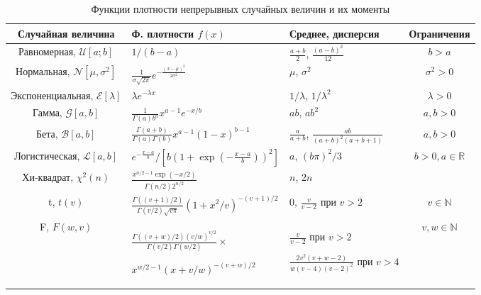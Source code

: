 \begin{table}[h]
\caption{\label{tab:density} Функции плотности непрерывных случайных величин и их моменты}
\begin{tabular}{cp{6cm}p{4cm}c}
\hline 
\hline
Случайная величина & Ф. плотности $f(x)$ & Среднее, дисперсия & Ограничения\\ 
\hline 
Равномерная, $\mathcal{U}[a;b]$ & $1/(b-a)$ & $\frac{a+b}{2}$, $\frac{(a-b)^2}{12}$ & $b>a$ \\ 
Нормальная, $\mathcal{N}[\mu,\sigma^2]$ & $\frac{1}{\sigma \sqrt{2\pi}}e^{-\frac{(x-\mu)^2}{2\sigma^2}}$ & $\mu$, $\sigma^2$ & $\sigma^2>0$ \\ 
Экспоненциальная, $\mathcal{E}[\lambda]$ & $\lambda e^{-\lambda x}$ & $1/\lambda$, $1/\lambda^2$ & $\lambda>0$ \\ 
Гамма, $\mathcal{G}[a,b]$ & $\frac{1}{\Gamma(a)b^a}x^{a-1}e^{-x/b}$ & $ab$, $ab^2$ & $a,b>0$ \\ 
Бета, $\mathcal{B}[a,b]$ & $\frac{\Gamma(a+b)}{\Gamma(a)\Gamma(b)}x^{a-1}(1-x)^{b-1}$ & $\frac{a}{a+b}$, $\frac{ab}{(a+b)^2(a+b+1)}$ & $a,b>0$ \\ 
Логистическая, $\mathcal{L}[a,b]$ & $e^{-\frac{x-a}{b}}/[b(1+\exp(-\frac{x-a}{b}))^2]$ & $a$, $(b\pi)^2/3$ & $b>0, a \in \mathbb{R}$ \\ 
Хи-квадрат, $\chi^2(n)$ & $\frac{x^{n/2-1}\exp(-x/2)}{\Gamma(n/2)2^{n/2}}$ & $n$, $2n$ & \\ 
t, $t(v)$ & $\frac{\Gamma((v+1)/2)}{\Gamma(v/2)\sqrt{v\pi}}(1+x^2/v)^{-(v+1)/2}$ & $0$, $\frac{v}{v-2}$ при $v>2$ & $v\in\mathbb{N}$ \\ 
F, $F(w,v)$ & $\frac{\Gamma((v+w)/2)(v/w)^{v/2}}{\Gamma(v/2)\Gamma(w/2)}\times$

$x^{w/2-1}(x+v/w)^{-(v+w)/2}$ & $\frac{v}{v-2}$ при $v>2$  

$\frac{2v^2(v+w-2)}{w(v-4)(v-2)^2}$ при $v>4$ & $v,w\in\mathbb{N}$\\
\hline
\hline
\end{tabular} 
\end{table}

